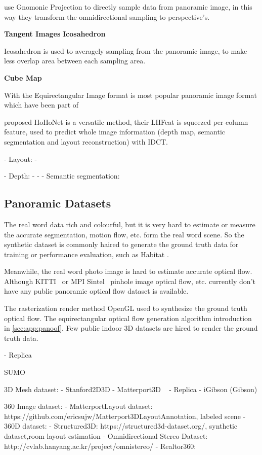 \cite{CoorsCG2018} use Gnomonic Projection to directly sample data from panoramic image, in this way they transform the omnidirectional sampling to perspective's.

\textbf{Tangent Images}
\textbf{Icosahedron}

Icosahedron is used to averagely sampling from the panoramic image, to make less overlap area between each sampling area.

\cite{EderPVBF2019}




\textbf{Cube Map}

With the
Equirectangular Image format is most popular panoramic image format which have been part of 


\citet{SunSC2021} proposed HoHoNet is a versatile method, their LHFeat is squeezed per-column feature, used to predict whole image information (depth map, semantic segmentation and layout reconstruction) with IDCT. 

- Layout:
- \cite{xxxx}

- Depth:
- \cite{WangYSCT2020}
- 
- Semantic segmentation:


\subsection{Panoramic Datasets}


The real word data rich and colourful, but it is very hard to estimate or measure the accurate segmentation, motion flow, etc. form the real word scene.
So the synthetic dataset is commonly haired to generate the ground truth data for training or performance evaluation, such as Habitat \cite{SavvaKMZWJSLKMPB2019}.

Meanwhile, the real word photo image is hard to estimate accurate optical flow.
Although KITTI~\cite{Menze2018JPRS} or MPI Sintel~\cite{ButleWSB2012} pinhole image optical flow, etc. currently don't have any public panoramic optical flow dataset is available.

The rasterization render method OpenGL used to synthesize the ground truth optical flow.
The equirectangular optical flow generation algorithm introduction in \cref{sec:app:panoof}.
Few public indoor 3D datasets are hired to render the ground truth data.

- Replica ~\cite{StrauWMCWGEMRVCYBYPYZLCBGMPSBSNGLN2019}

SUMO


3D Mesh dataset:
- Stanford2D3D \cite{ArmenSZS2017}
- Matterport3D ~\cite{ChangDFHNSSZZ2017}
- Replica \cite{StrauWMCWGEMRVCYBYPYZLCBGMPSBSNGLN2019}
- iGibson (Gibson)


360 Image dataset:
- MatterportLayout dataset: https://github.com/ericsujw/Matterport3DLayoutAnnotation, labeled scene
- 360D dataset:
- Structured3D: https://structured3d-dataset.org/, synthetic dataset,room layout estimation
- Omnidirectional Stereo Dataset: http://cvlab.hanyang.ac.kr/project/omnistereo/
- Realtor360: 

